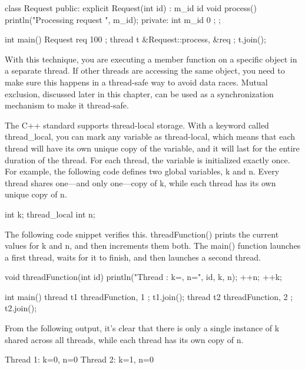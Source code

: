\begin{cpp}
class Request
{
    public:
        explicit Request(int id) : m_id { id } { }
        void process() { println("Processing request {}", m_id); }
    private:
        int m_id { 0 };
};

int main()
{
    Request req { 100 };
    thread t { &Request::process, &req };
    t.join();
}
\end{cpp}

With this technique, you are executing a member function on a specific object in a separate thread. If other threads are accessing the same object, you need to make sure this happens in a thread-safe way to avoid data races. Mutual exclusion, discussed later in this chapter, can be used as a synchronization mechanism to make it thread-safe.


The C++ standard supports thread-local storage. With a keyword called thread\_local, you can mark any variable as thread-local, which means that each thread will have its own unique copy of the variable, and it will last for the entire duration of the thread. For each thread, the variable is initialized exactly once. For example, the following code defines two global variables, k and n. Every thread shares one—and only one—copy of k, while each thread has its own unique copy of n.

\begin{cpp}
int k;
thread_local int n;
\end{cpp}

The following code snippet verifies this. threadFunction() prints the current values for k and n, and then increments them both. The main() function launches a first thread, waits for it to finish, and then launches a second thread.

\begin{cpp}
void threadFunction(int id)
{
    println("Thread {}: k={}, n={}", id, k, n);
    ++n;
    ++k;
}

int main()
{
    thread t1 { threadFunction, 1 }; t1.join();
    thread t2 { threadFunction, 2 }; t2.join();
}
\end{cpp}

From the following output, it’s clear that there is only a single instance of k shared across all threads, while each thread has its own copy of n.

\begin{shell}
Thread 1: k=0, n=0
Thread 2: k=1, n=0
\end{shell}

